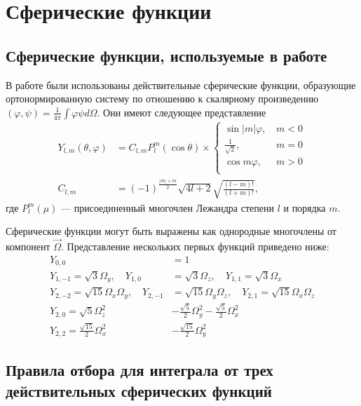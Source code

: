 \chapter{Сферические функции}
\label{chap:spher}

\section{Сферические функции, используемые в работе}

В работе были использованы действительные сферические функции, образующие ортонормированную систему по отношению
к скалярному произведению $(\varphi, \psi) = \frac{1}{4\pi} \int \varphi \psi d\Omega$. Они имеют следующее представление
\begin{align*}
Y_{l,m}(\theta, \varphi) &= C_{l,m}P_l^{m}(\cos \theta)\times
\begin{cases}
\sin |m| \varphi,&\, m<0\\
\frac{1}{\sqrt{2}},&\, m=0\\
\cos m \varphi,&\, m>0\\
\end{cases}
\label{eq:sphfunc}\\
C_{l,m} &= (-1)^{\frac{|m|+m}{2}}\sqrt{4l+2}\sqrt{\frac{(l-m)!}{(l+m)!}},
\end{align*}
где $P^m_l(\mu)$ --- присоединенный многочлен Лежандра степени $l$ и порядка $m$.

Сферические функции могут быть выражены как однородные многочлены от компонент $\vec \Omega$. Представление нескольких первых 
функций приведено ниже:
\begin{align*}
Y_{0,0} &= 1\\
Y_{1,-1} = \sqrt{3}\Omega_y,\quad
Y_{1,0} &= \sqrt{3}\Omega_z,\quad
Y_{1,1} = \sqrt{3}\Omega_x\\
Y_{2,-2} = \sqrt{15}\Omega_x\Omega_y,\quad
Y_{2,-1} &= \sqrt{15}\Omega_y\Omega_z, \quad
Y_{2,1} = \sqrt{15}\Omega_x\Omega_z\\
Y_{2,0} = \sqrt{5}\Omega_z^{2}&-\frac{\sqrt{5}}{2}\Omega_y^{2}-\frac{\sqrt{5}}{2}\Omega_x^{2}\\
Y_{2,2} = \frac{\sqrt{15}}{2}\Omega_x^{2}&-\frac{\sqrt{15}}{2}\Omega_y^{2}
\end{align*}

\section{Правила отбора для интеграла от трех действительных сферических функций}

